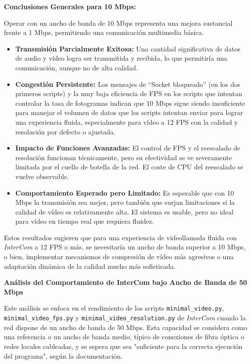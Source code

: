 \vspace{\baselineskip}

\textbf{Conclusiones Generales para 10 Mbps:}

Operar con un ancho de banda de 10 Mbps representa una mejora sustancial frente a 1 Mbps, permitiendo una comunicación multimedia básica.
\begin{itemize}
    \item \textbf{Transmisión Parcialmente Exitosa:} Una cantidad significativa de datos de audio y vídeo logra ser transmitida y recibida, lo que permitiría una comunicación, aunque no de alta calidad.
    \item \textbf{Congestión Persistente:} Los mensajes de ``Socket bloqueado'' (en los dos primeros scripts) y la muy baja eficiencia de FPS en los scripts que intentan controlar la tasa de fotogramas indican que 10 Mbps sigue siendo insuficiente para manejar el volumen de datos que los scripts intentan enviar para lograr una experiencia fluida, especialmente para vídeo a 12 FPS con la calidad y resolución por defecto o ajustada.
    \item \textbf{Impacto de Funciones Avanzadas:} El control de FPS y el reescalado de resolución funcionan técnicamente, pero su efectividad se ve severamente limitada por el cuello de botella de la red. El coste de CPU del reescalado se vuelve observable.
    \item \textbf{Comportamiento Esperado pero Limitado:} Es esperable que con 10 Mbps la transmisión sea mejor, pero también que surjan limitaciones si la calidad de vídeo es relativamente alta. El sistema es usable, pero no ideal para vídeo en tiempo real que requiera fluidez.
\end{itemize}
Estos resultados sugieren que para una experiencia de videollamada fluida con \textit{InterCom} a 12 FPS o más, se necesitaría un ancho de banda superior a 10 Mbps, o bien, implementar mecanismos de compresión de vídeo más agresivos o una adaptación dinámica de la calidad mucho más sofisticada.

\begin{center}
    \Large \textbf{Análisis del Comportamiento de InterCom bajo Ancho de Banda de 50 Mbps}
\end{center}
\vspace{\baselineskip}

Este análisis se enfoca en el rendimiento de los scripts \texttt{minimal\_video.py}, \texttt{minimal\_video\_fps.py} y \texttt{minimal\_video\_resolution.py} de \textit{InterCom} cuando la red dispone de un ancho de banda de 50 Mbps. Esta capacidad se considera como una referencia o un ancho de banda medio, típico de conexiones de fibra óptica o redes locales cableadas, y se espera que sea "suficiente para la correcta ejecución del programa", según la documentación.

